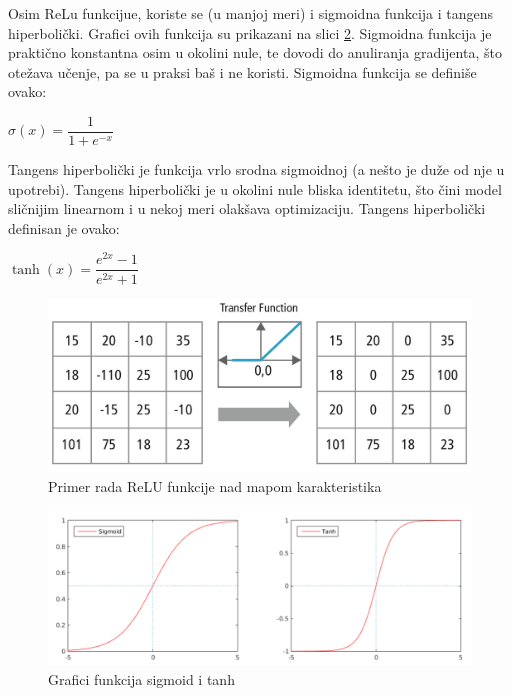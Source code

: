 \documentclass[a4paper]{article}
\begin{document}
Osim ReLu funkcijue, koriste se (u manjoj meri) i sigmoidna funkcija i tangens hiperbolički. Grafici ovih funkcija su prikazani na slici \ref{fig:sigmoid_tanh}. Sigmoidna funkcija je praktično konstantna osim u okolini nule, te dovodi do anuliranja gradijenta, što otežava učenje, pa se u praksi baš i ne koristi. Sigmoidna funkcija se definiše ovako:

\begin{center}
$\sigma(x) = \dfrac{1}{1 + e^{-x}}$
\end{center}

Tangens hiperbolički je funkcija vrlo srodna sigmoidnoj (a nešto je duže od nje u upotrebi). Tangens hiperbolički je u okolini nule bliska identitetu, što čini model sličnijim linearnom i u nekoj meri olakšava optimizaciju. Tangens hiperbolički definisan je ovako:

\begin{center}
$\tanh(x) = \dfrac{e^{2x}-1}{e^{2x}+1}$
\end{center}

\begin{figure}[h!]
\begin{center}
\includegraphics[scale=0.20]{relu1.jpg}
\end{center}
\caption{Primer rada ReLU funkcije nad mapom karakteristika}
\label{fig:relu_transform}
\end{figure}


\begin{figure}[h!]
\begin{center}
\includegraphics[scale=0.5]{sigmoid_tanh_graph.png}
\end{center}
\caption{Grafici funkcija sigmoid i tanh}
\label{fig:sigmoid_tanh}
\end{figure}
\end{document}
